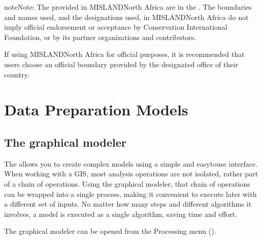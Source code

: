 \documentclass[letterpaper,10pt,english]{sphinxmanual}
\begin{document}
\begin{sphinxadmonition}{note}{Note:}
\sphinxAtStartPar
The  provided in MISLAND\sphinxhyphen{}North Africa
are in the . The boundaries and names used, and the
designations used, in MISLAND\sphinxhyphen{}North Africa do not imply official endorsement or
acceptance by Conservation International Foundation, or by its partner
organizations and contributors.

\sphinxAtStartPar
If using MISLAND\sphinxhyphen{}North Africa for official purposes, it is recommended that users
choose an official boundary provided by the designated office of their
country.
\end{sphinxadmonition}

\sphinxstepscope


\chapter{Data Preparation Models}
\label{\detokenize{Introduction/models:data-preparation-models}}\label{\detokenize{Introduction/models::doc}}

\section{The graphical modeler}
\label{\detokenize{Introduction/models:the-graphical-modeler}}
\sphinxAtStartPar
The  allows you to create complex models using
a simple and easy\sphinxhyphen{}to\sphinxhyphen{}use interface.
When working with a GIS, most analysis operations are not
isolated, rather part of a chain of operations.
Using the graphical modeler, that chain of operations can be wrapped
into a single process, making it convenient to execute later with a
different set of inputs.
No matter how many steps and different algorithms it involves, a
model is executed as a single algorithm, saving time and effort.

\sphinxAtStartPar
The graphical modeler can be opened from the Processing menu
().
\end{document}
